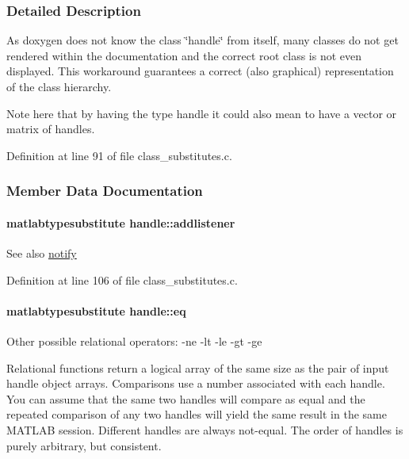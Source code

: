 \subsubsection{Detailed Description}
As doxygen does not know the class \char`\"{}handle\char`\"{} from itself, many classes do not get rendered within the documentation and the correct root class is not even displayed. This workaround guarantees a correct (also graphical) representation of the class hierarchy.

Note here that by having the type handle it could also mean to have a vector or matrix of handles. 

Definition at line 91 of file class\+\_\+substitutes.\+c.



\subsubsection{Member Data Documentation}
\hypertarget{classhandle_aa72d46799b8792edbf8acb7349680c15}{}
\paragraph[{addlistener}]{\setlength{\rightskip}{0pt plus 5cm}matlabtypesubstitute handle\+::addlistener}\label{classhandle_aa72d46799b8792edbf8acb7349680c15}
\begin{DoxySeeAlso}{See also}
\hyperlink{classhandle_a8cfc3dab9d3ecc55b0b3449c2c7afd6f}{notify} 
\end{DoxySeeAlso}


Definition at line 106 of file class\+\_\+substitutes.\+c.

\hypertarget{classhandle_a2fb018cd603a5ced1783bfb20c6cce86}{}
\paragraph[{eq}]{\setlength{\rightskip}{0pt plus 5cm}matlabtypesubstitute handle\+::eq}\label{classhandle_a2fb018cd603a5ced1783bfb20c6cce86}
\begin{DoxyParagraph}{Other possible relational operators\+:}
-\/ne -\/lt -\/le -\/gt -\/ge
\end{DoxyParagraph}
Relational functions return a logical array of the same size as the pair of input handle object arrays. Comparisons use a number associated with each handle. You can assume that the same two handles will compare as equal and the repeated comparison of any two handles will yield the same result in the same M\+A\+T\+L\+A\+B session. Different handles are always not-\/equal. The order of handles is purely arbitrary, but consistent. 

